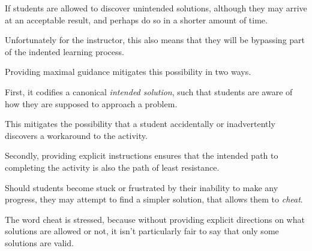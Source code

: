 If students are allowed to discover unintended solutions, although they may arrive at an acceptable result, and perhaps do so in a shorter amount of time. %







Unfortunately for the instructor, this also means that they will be bypassing part of the indented learning process. %







Providing maximal guidance mitigates this possibility in two ways. %







First, it codifies a canonical \emph{intended solution}, such that students are aware of how they are supposed to approach a problem. %







This mitigates the possibility that a student accidentally or inadvertently discovers a workaround to the activity. %







Secondly, providing explicit instructions ensures that the intended path to completing the activity is also the path of least resistance. %







Should students become stuck or frustrated by their inability to make any progress, they may attempt to find a simpler solution, that allows them to \emph{cheat}. %







The word cheat is stressed, because without providing explicit directions on what solutions are allowed or not, it isn't particularly fair to say that only some solutions are valid. 















        







    















        















